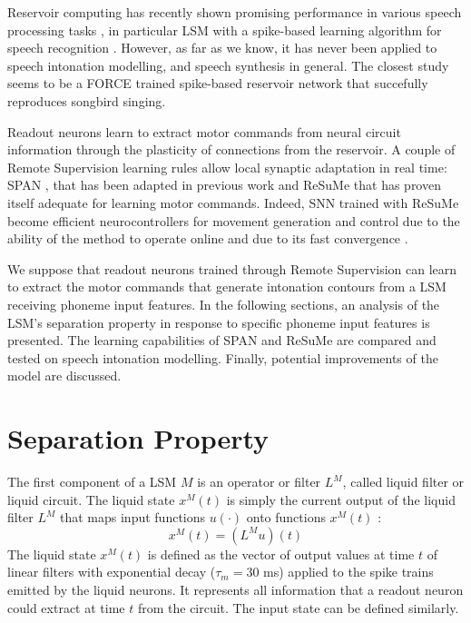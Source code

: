\documentclass[11pt, a4paper]{article} %
\begin{document}
Reservoir computing has recently shown promising performance in various speech processing tasks \cite{triefenbach2014large, triefenbach2010phoneme, ikeda2018short, zhao2018nonlinear}, in particular LSM with a spike-based learning algorithm for speech recognition \cite{zhang2015digital}. However, as far as we know, it has never been applied to speech intonation modelling, and speech synthesis in general. The closest study seems to be a FORCE trained spike-based reservoir network \cite{nicola2016supervised} that succefully reproduces songbird singing.

Readout neurons learn to extract motor commands from neural circuit information through the plasticity of connections from the reservoir. A couple of Remote Supervision learning rules allow local synaptic adaptation in real time: SPAN \cite{mohemmed2012span, mohemmed2013training}, that has been adapted in previous work \cite{schnell2018neural} and ReSuMe \cite{ponulak2006supervised, ponulak2010supervised} that has proven itself adequate for learning motor commands. Indeed, SNN trained with ReSuMe become efficient neurocontrollers for movement generation and control due to the ability of the method to operate online and due to its fast convergence \cite{ponulak2010supervised}. 

We suppose that readout neurons trained through Remote Supervision can learn to extract the motor commands that generate intonation contours from a LSM receiving phoneme input features. In the following sections, an analysis of the LSM's separation property in response to specific phoneme input features is presented. The learning capabilities of SPAN and ReSuMe are compared and tested on speech intonation modelling. Finally, potential improvements of the model are discussed.


\section{Separation Property}
The first component of a LSM $M$ is an operator or filter $L^M$, called liquid filter or liquid circuit. The liquid state $x^M(t)$ is simply the current output of the liquid filter $L^M$ that maps input functions $u(\cdot)$ onto functions $x^M(t)$ \cite{maass2002real}: \begin{equation}
x^M(t) = (L^M u)(t)
\end{equation}
The liquid state $x^M(t)$ is defined as the vector of output values at time $t$ of linear filters with exponential decay ($\tau_m = 30$ ms) applied to the spike trains emitted by the liquid neurons. It represents all information that a readout neuron could extract at time $t$ from the circuit. The input state can be defined similarly.
\end{document}
